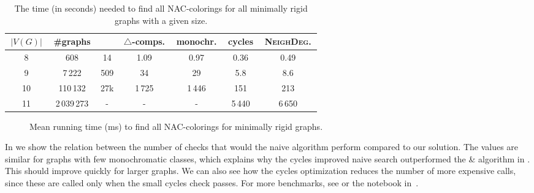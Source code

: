 \begin{table}[t]
	\caption{The time (in seconds) needed to find all NAC-colorings for all minimally rigid graphs with a given size.}%
	\label{tab:allMinRigid}
	\vspace{0.3cm}
	\centering
	\begin{tabular}{ccccccc}
		\hline
		\,$|V(G)|$\, & \,\#graphs\, & \,\flexrilog{}\, & \,$\triangle$-comps.\, & \,monochr.\, & \,cycles\, & \,\textsc{NeighDeg.}\, \\
		\hline
		8            & 608          & 14               & 1.09                   & 0.97         & 0.36       & 0.49                   \\
		9            & 7\,222       & 509              & 34                     & 29           & 5.8        & 8.6                    \\
		10           & 110\,132     & 27k              & 1\,725                 & 1\,446       & 151        & 213                    \\
		11           & 2\,039\,273  & -                & -                      & -            & 5\,440     & 6\,650                 \\
		\hline
	\end{tabular}
\end{table}

\begin{figure}[t]
	\centering
	\scalebox{0.5}{}
	\caption{Mean running time (ms) to find all NAC-colorings for minimally rigid graphs.}%
	\label{fig:graph_time_minimally_rigid}
\end{figure}

In  we show the relation between the number of checks \IsNACColoring{} that
would the naive algorithm perform compared to our solution.
The values are similar for graphs with few monochromatic classes,
which explains why the cycles improved naive search outperformed
the \NeighborsDegree{}\&\MergeLinear{} algorithm in . This should improve quickly for larger graphs.
We can also see how the cycles optimization
reduces the number of more expensive \IsNACColoring{} calls,
since these are called only when the small cycles check \CycleMask{} passes.
For more benchmarks, see  or the notebook in~\cite{pyrigi_github_lastaapps}.

